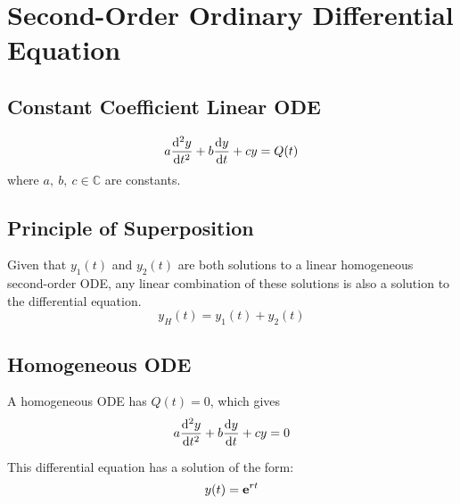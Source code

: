 \documentclass{article}
\begin{document}
\section{Second-Order Ordinary Differential Equation}
\subsection{Constant Coefficient Linear ODE}
\begin{equation*}
    a \dv[2]{y}{t} + b \dv{y}{t} + c y = Q(t)
\end{equation*}
where $a,\:b,\:c\in\mathbb{C}$ are constants.
\subsection{Principle of Superposition}
Given that $y_1(t)$ and $y_2(t)$ are both solutions to a linear homogeneous second-order ODE, any linear combination of these solutions is also a solution to the differential equation.
\begin{equation*}
    y_H(t) = y_1(t) + y_2(t)
\end{equation*}
\subsection{Homogeneous ODE}
\begin{definition}
    A homogeneous ODE has $Q(t)=0$, which gives
    \begin{equation*}
        a \dv[2]{y}{t} + b \dv{y}{t} + c y = 0
    \end{equation*} 
\end{definition}
This differential equation has a solution of the form:
\begin{equation*}
    y(t) = \mathbf{e}^{rt}
\end{equation*}
\end{document}
